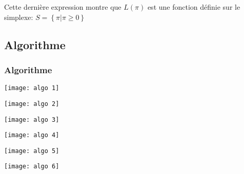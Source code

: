 \documentclass[t,10pt]{beamer}
\begin{document}
    \begin{frame}
        Cette dernière expression montre que $L(\pi)$ est une fonction définie sur le simplexe:
        $S = \left\{ \pi | \pi \ge 0 \right\}$
    \end{frame}

    \subsection{Algorithme}

    \begin{frame}\frametitle{\small Algorithme}
        \texttt{[image: algo 1]}
    \end{frame}

    \begin{frame}
        \texttt{[image: algo 2]}
    \end{frame}

    \begin{frame}
        \texttt{[image: algo 3]}
    \end{frame}

    \begin{frame}
        \texttt{[image: algo 4]}
    \end{frame}

    \begin{frame}
        \texttt{[image: algo 5]}
    \end{frame}

    \begin{frame}
        \texttt{[image: algo 6]}
    \end{frame}
\end{document}

